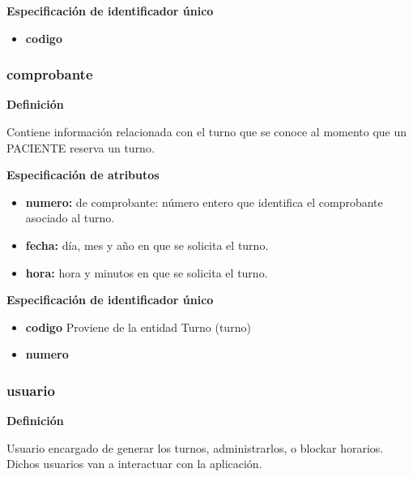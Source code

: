 \documentclass[a4paper,11pt]{article}
\begin{document}
\textbf{Especificación de identificador único}

\begin{itemize}

     \item \textbf{codigo}

\end{itemize}

\subsubsection{\textbf{comprobante}}

\textbf{Definición}

Contiene información relacionada con el turno que se conoce al momento que un 
PACIENTE reserva un turno.

\textbf{Especificación de atributos}

\begin{itemize}

     \item \textbf{numero:} de comprobante: número entero que identifica el comprobante asociado 
     al turno.

     \item \textbf{fecha:} día, mes y año en que se solicita el turno.

     \item \textbf{hora:} hora y minutos en que se solicita el turno.

\end{itemize}

\textbf{Especificación de identificador único}

\begin{itemize}

     \item \textbf{codigo} Proviene de la entidad Turno (turno)

     \item \textbf{numero}

\end{itemize}

\subsubsection{\textbf{usuario}}

\textbf{Definición}

Usuario encargado de generar los turnos, administrarlos, o blockar horarios.
Dichos usuarios van a interactuar con la aplicación.
\end{document}

